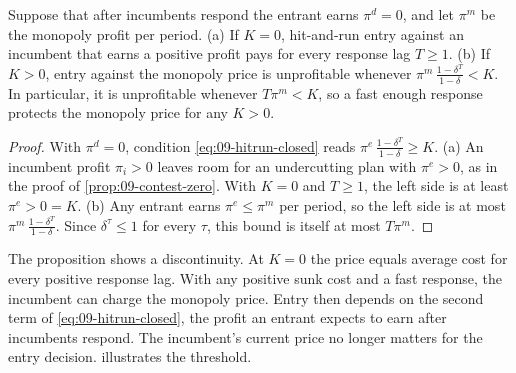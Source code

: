\begin{proposition}\label{prop:09-fragility}
Suppose that after incumbents respond the entrant earns $\pi^d = 0$, and let $\pi^m$ be the monopoly profit per
period. (a) If $K = 0$, hit-and-run entry against an incumbent that earns a positive profit pays for every
response lag $T \ge 1$. (b) If $K > 0$, entry against the monopoly price is unprofitable whenever
$\pi^m\,\frac{1-\delta^T}{1-\delta} < K$. In particular, it is unprofitable whenever $T\pi^m < K$, so a fast
enough response protects the monopoly price for any $K > 0$.
\end{proposition}

\begin{proof}
With $\pi^d = 0$, condition \eqref{eq:09-hitrun-closed} reads $\pi^e\,\frac{1-\delta^T}{1-\delta} \ge K$.
(a) An incumbent profit $\pi_i > 0$ leaves room for an undercutting plan with $\pi^e > 0$, as in the proof
of \cref{prop:09-contest-zero}. With $K = 0$ and $T \ge 1$, the left side is at least $\pi^e > 0 = K$. (b) Any
entrant earns $\pi^e \le \pi^m$ per period, so the left side is at most $\pi^m\,\frac{1-\delta^T}{1-\delta}$.
Since $\delta^\tau \le 1$ for every $\tau$, this bound is itself at most $T\pi^m$.
\end{proof}

The proposition shows a discontinuity. At $K = 0$ the price equals average cost for every positive response
lag. With any positive sunk cost and a fast response, the incumbent can charge the monopoly price. Entry then
depends on the second term of \eqref{eq:09-hitrun-closed}, the profit an entrant expects to earn after
incumbents respond. The incumbent's current price no longer matters for the entry decision. 
illustrates the threshold.

